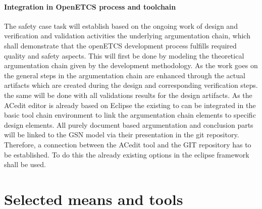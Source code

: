 \paragraph{Integration in OpenETCS process and toolchain}

The safety case task will establish based on the ongoing work of design and verification and validation activities the underlying argumentation chain, which shall demonstrate that the openETCS development process fulfills required quality and safety aspects. This will first be done by modeling the theoretical argumentation chain given by the development methodology. 
As the work goes on the general steps in the argumentation chain are enhanced through the actual artifacts which are created during the design and corresponding verification steps. the same will be done with all validations results for the design artifacts. 
As the ACedit editor is already based on Eclipse the existing to can be integrated in the basic tool chain environment to link the argumentation chain elements to specific design elements. All purely document based argumentation and conclusion parts will be linked to the GSN model via their presentation in the git repository. Therefore, a connection between the ACedit tool and the GIT repository has to be established. To do this the already existing options in the eclipse framework shall be used.


\section{Selected means and tools}

\begin{comment}
To complete after decision meeting with a section for each tool with the following contents:

\begin{itemize}
\item description of the means or tools, references and links
\item added value for openETCS
\item for which tasks and how (input/output/actions) is the mean or tools used.
\end{itemize}
\end{comment}
